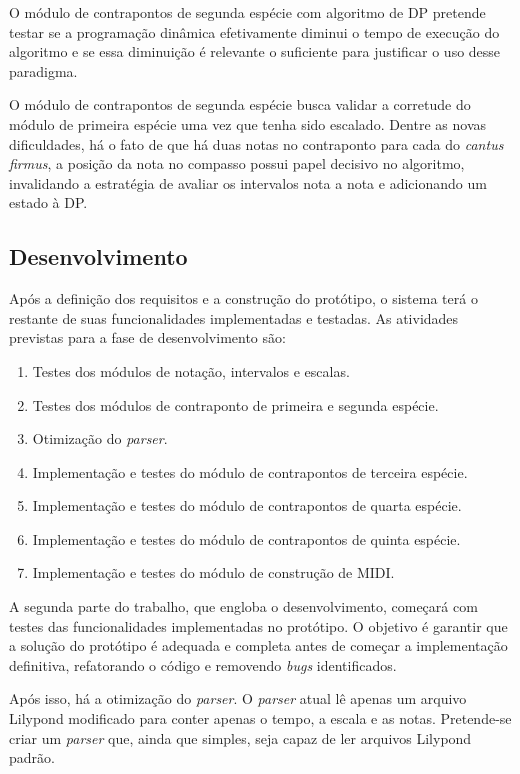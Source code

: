     O módulo de contrapontos de segunda espécie com algoritmo de DP pretende testar se a programação dinâmica efetivamente diminui o tempo de execução do algoritmo e se essa diminuição é relevante o suficiente para justificar o uso desse paradigma.

    O módulo de contrapontos de segunda espécie busca validar a corretude do módulo de primeira espécie uma vez que tenha sido escalado. Dentre as novas dificuldades, há o fato de que há duas notas no contraponto para cada do \textit{cantus firmus}, a posição da nota no compasso possui papel decisivo no algoritmo, invalidando a estratégia de avaliar os intervalos nota a nota e adicionando um estado à DP.

  \subsection[Desenvolvimento]{Desenvolvimento}

    Após a definição dos requisitos e a construção do protótipo, o sistema terá o restante de suas funcionalidades implementadas e testadas. As atividades previstas para a fase de desenvolvimento são:

    \begin{enumerate}
      \item Testes dos módulos de notação, intervalos e escalas.
      \item Testes dos módulos de contraponto de primeira e segunda espécie.
      \item Otimização do \textit{parser}.
      \item Implementação e testes do módulo de contrapontos de terceira espécie.
      \item Implementação e testes do módulo de contrapontos de quarta espécie.
      \item Implementação e testes do módulo de contrapontos de quinta espécie.
      \item Implementação e testes do módulo de construção de MIDI.
    \end{enumerate}

    A segunda parte do trabalho, que engloba o desenvolvimento, começará com testes das funcionalidades implementadas no protótipo. O objetivo é garantir que a solução do protótipo é adequada e completa antes de começar a implementação definitiva, refatorando o código e removendo \textit{bugs} identificados.

    Após isso, há a otimização do \textit{parser}. O \textit{parser} atual lê apenas um arquivo Lilypond modificado para conter apenas o tempo, a escala e as notas. Pretende-se criar um \textit{parser} que, ainda que simples, seja capaz de ler arquivos Lilypond padrão.

